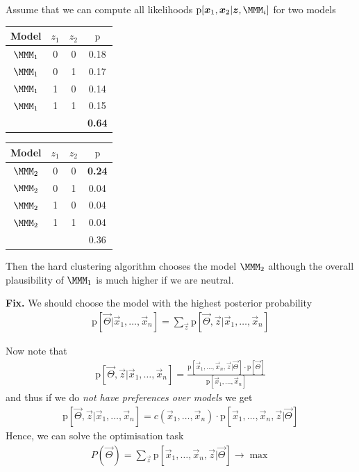 \documentclass[landscape,footrule]{foils}
\newcommand{\pd}[1]{\mathrm{p}[#1]}
\begin{document}


\enlargethispage{1cm}
Assume that we can compute all likelihoods $\pd{\vec{x}_1,\vec{x}_2|\vec{z},\MMM_i}$ for two models

\begin{center}
\begin{tabular}{cccc}
Model    & $z_1$ & $z_2$ & $\mathrm{p}$\\
\hline
$\MMM_1$ & 0 & 0 & 0.18\\
$\MMM_1$ & 0 & 1 & 0.17\\
$\MMM_1$ & 1 & 0 & 0.14\\
$\MMM_1$ & 1 & 1 & 0.15\\
\hline
&&& \textbf{0.64}
\end{tabular}\hspace*{2cm}
\begin{tabular}{cccc}
Model    & $z_1$ & $z_2$ & $\mathrm{p}$\\
\hline
$\MMM_2$ & 0 & 0 & \textbf{0.24}\\
$\MMM_2$ & 0 & 1 & 0.04\\
$\MMM_2$ & 1 & 0 & 0.04\\
$\MMM_2$ & 1 & 1 & 0.04\\
\hline
&&& 0.36
\end{tabular}
\end{center}
Then the hard clustering algorithm chooses the model $\MMM_2$ although the overall plausibility of $\MMM_1$ is much higher if we are neutral. 

\textbf{Fix.} We should choose the model with the highest posterior probability
\begin{align*}
\pd{\vec{\Theta}|\vec{x}_1,\ldots,\vec{x}_n}=\sum_{\vec{z}}\pd{\vec{\Theta},\vec{z}|\vec{x}_1,\ldots,\vec{x}_n}
\end{align*}


Now note that 
\begin{align*}
\pd{\vec{\Theta},\vec{z}|\vec{x}_1,\ldots,\vec{x}_n}=\frac{\pd{\vec{x}_1,\ldots,\vec{x}_n,\vec{z}|\vec{\Theta}} \cdot\pd{\vec{\Theta}}}{\pd{\vec{x}_1,\ldots,\vec{x}_n}}
\end{align*}
and thus if we do \emph{not have preferences over models} we get 
\begin{align*}
\pd{\vec{\Theta},\vec{z}|\vec{x}_1,\ldots,\vec{x}_n}=c(\vec{x}_1,\ldots,\vec{x}_n)\cdot\pd{\vec{x}_1,\ldots,\vec{x}_n,\vec{z}|\vec{\Theta}} 
\end{align*}
Hence, we can solve the optimisation task
\begin{align*}
P(\vec{\Theta})=\sum_{\vec{z}}\pd{\vec{x}_1,\ldots,\vec{x}_n,\vec{z}|\vec{\Theta}}\to\max 
\end{align*}
\end{document}
